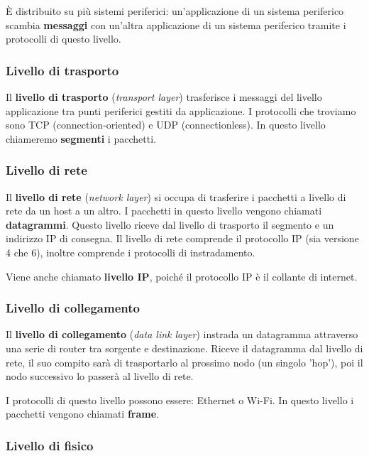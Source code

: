 È distribuito su più sistemi periferici: un'applicazione di un sistema periferico scambia \textbf{messaggi} con un'altra applicazione di un sistema periferico tramite i protocolli di questo livello.

\subsubsection*{Livello di trasporto}

Il \textbf{livello di trasporto} (\textit{transport layer}) trasferisce i messaggi del livello applicazione tra punti periferici gestiti da applicazione. I protocolli che troviamo sono TCP (connection-oriented) e UDP (connectionless). In questo livello chiameremo \textbf{segmenti} i pacchetti.

\subsubsection*{Livello di rete}

Il \textbf{livello di rete} (\textit{network layer}) si occupa di trasferire i pacchetti a livello di rete da un host a un altro. I pacchetti in questo livello vengono chiamati \textbf{datagrammi}. Questo livello riceve dal livello di trasporto il segmento e un indirizzo IP di consegna. Il livello di rete comprende il protocollo IP (sia versione 4 che 6), inoltre comprende i protocolli di instradamento.

Viene anche chiamato \textbf{livello IP}, poiché il protocollo IP è il collante di internet.

\subsubsection*{Livello di collegamento}

Il \textbf{livello di collegamento} (\textit{data link layer}) instrada un datagramma attraverso una serie di router tra sorgente e destinazione. Riceve il datagramma dal livello di rete, il suo compito sarà di trasportarlo al prossimo nodo (un singolo 'hop'), poi il nodo successivo lo passerà al livello di rete.

I protocolli di questo livello possono essere: Ethernet o Wi-Fi. In questo livello i pacchetti vengono chiamati \textbf{frame}.

\subsubsection*{Livello di fisico}

